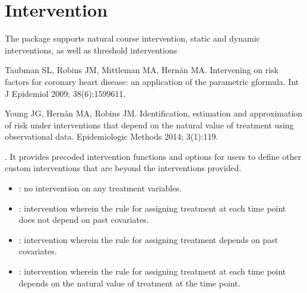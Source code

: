 \documentclass[letterpaper,10pt,english]{sphinxmanual}
\begin{document}
\section{Intervention}
\label{\detokenize{Specifications/Intervention:intervention}}\label{\detokenize{Specifications/Intervention:id1}}\label{\detokenize{Specifications/Intervention::doc}}
\sphinxAtStartPar
The package supports natural course intervention, static and dynamic interventions, as well as
threshold interventions \sphinxstepexplicit %
\begin{footnote}[1]\label{\thesphinxscope.1}%
\sphinxAtStartFootnote
Taubman SL, Robins JM, Mittleman MA, Hernán MA. Intervening on risk factors for coronary heart disease: an
application of the parametric g\sphinxhyphen{}formula. Int J Epidemiol 2009; 38(6):1599\sphinxhyphen{}611.
%
\end{footnote} \sphinxstepexplicit %
\begin{footnote}[2]\label{\thesphinxscope.2}%
\sphinxAtStartFootnote
Young JG, Hernán MA, Robins JM. Identification, estimation and approximation of risk under interventions that
depend on the natural value of treatment using observational data. Epidemiologic Methods 2014; 3(1):1\sphinxhyphen{}19.
%
\end{footnote} . It provides pre\sphinxhyphen{}coded intervention functions and options for users
to define other custom interventions that are beyond the interventions
provided.
\begin{itemize}
\item {} 
\sphinxAtStartPar
{}: no intervention on any treatment variables.

\item {} 
\sphinxAtStartPar
{}:  intervention wherein the rule for assigning treatment at each time point does not depend on past covariates.

\item {} 
\sphinxAtStartPar
{}: intervention wherein the rule for assigning treatment depends on past covariates.

\item {} 
\sphinxAtStartPar
{}: intervention wherein the rule for assigning treatment at each time point depends on the natural value of treatment at the time point.

\end{itemize}
\end{document}
